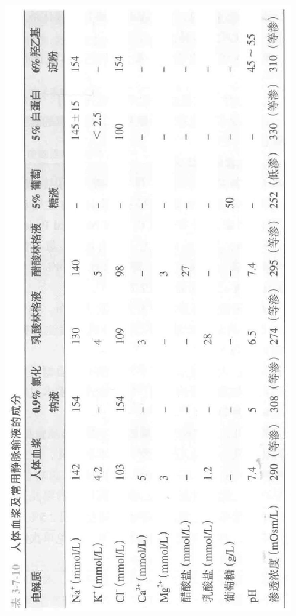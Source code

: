 \documentclass[10pt]{article}
\begin{document}
\begin{center}
\includegraphics[max width=\textwidth]{2024_07_05_645bb794a4d4f32ee0c8g-123}
\end{center}
\end{document}
